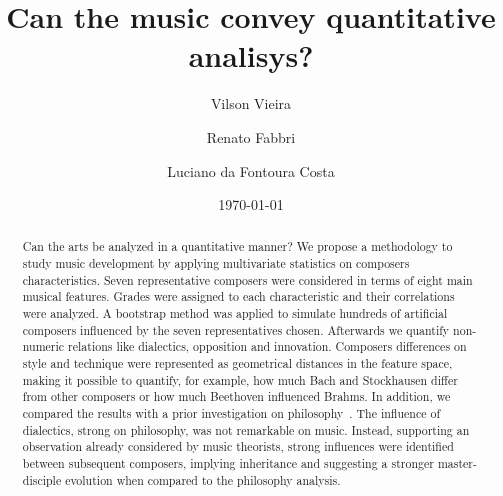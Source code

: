\documentclass[
 aip,
 jmp,
 amsmath,amssymb,
 reprint,
]{revtex4-1}
\begin{document}

\title[Can the music pathways convey quantitative analisys?]{Can the music convey quantitative analisys?}

\author{Vilson Vieira}

\author{Renato Fabbri}

\author{Luciano da Fontoura Costa}

\date{\today}

\begin{abstract}

Can the arts be analyzed in a quantitative manner? We propose a
methodology
to study music development by
applying multivariate statistics on composers characteristics.
Seven representative composers were considered in terms of
eight main musical features. 
Grades
were assigned to each characteristic and their correlations were
analyzed. 
A bootstrap method was
applied to simulate hundreds of artificial composers
influenced by the seven representatives chosen.
Afterwards we quantify non-numeric relations like dialectics, opposition
and innovation.
Composers differences on style and technique were represented
as geometrical distances in the feature space, making it possible to
quantify, for example, how much Bach and Stockhausen differ from other composers or how
much Beethoven influenced Brahms.
In addition, we compared the results with a prior investigation
on
philosophy~\cite{Fabbri}. The influence of dialectics, strong on
philosophy, was not remarkable on music.
Instead, supporting an observation already considered by music
theorists, strong influences were identified between
subsequent composers, implying inheritance and suggesting a stronger
master-disciple evolution when compared to the philosophy analysis.
\end{abstract}


\maketitle
\end{document}
